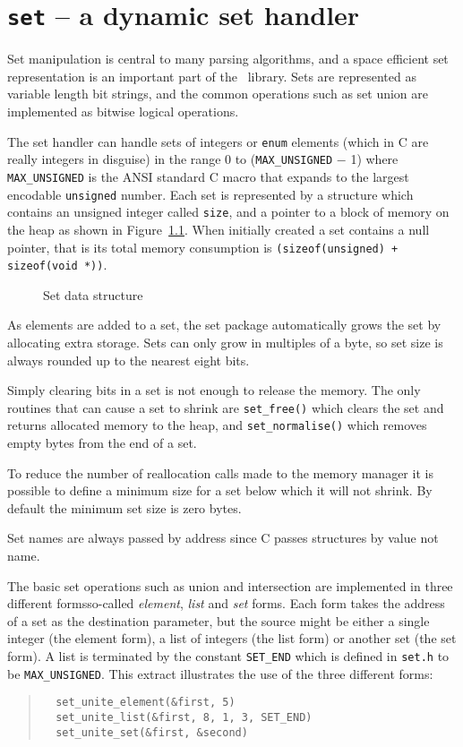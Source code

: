 \chapter{{\tt set} -- a dynamic set handler}

Set manipulation is central to many parsing algorithms, and a space
efficient set representation is an important part of the \rdpsupp\
library. Sets are represented as variable length bit strings, and the
common operations such as set union are implemented as bitwise logical
operations. 

The set handler can handle sets of integers or {\tt enum} elements
(which in C are really integers in disguise) in the range 0 to
(\verb+MAX_UNSIGNED+ $-$ 1) where \verb+MAX_UNSIGNED+ is the ANSI
standard C macro that expands to the largest encodable {\tt unsigned}
number. Each set is represented by a structure which contains an
unsigned integer called  {\tt size}, and a pointer to a block of memory
on the heap as shown in Figure~\ref{set:structure}. When initially
created a set contains a null pointer, that is its total memory
consumption is \verb|(sizeof(unsigned) + sizeof(void *))|.

\begin{figure}
\begin{center}

\end{center}
\caption{Set data structure}
\label{set:structure}
\end{figure}

As elements are added to a set, the set package automatically grows the
set by allocating extra storage. Sets can only grow in multiples of a
 byte,
so set size is always rounded up to the nearest eight bits.

Simply clearing bits in a set is not enough to release the memory.
The only routines that can cause a set to shrink are \verb+set_free()+
which clears the set and returns allocated memory to the heap, and
\verb+set_normalise()+ which removes empty bytes from the end of a set.

To reduce the number of reallocation calls made to the memory manager it
is possible to define a minimum size for a set below which it will not
shrink. By default the minimum set size is zero bytes.

Set names are always passed by address since C passes structures by
value not name. 

The basic set operations such as union and intersection are implemented in three
 different forms\dash so-called {\em element}, {\em list} and {\em set\/}
forms. Each form takes the address of a set as the destination
parameter, but the source might be either a single integer (the element
form), a list of integers (the list form) or another set (the set form).
A list is terminated by the constant \verb+SET_END+ which is defined in
{\tt set.h} to be \verb+MAX_UNSIGNED+. This extract 
illustrates the use of the three different
forms:
\begin{quote}
\begin{verbatim}
  set_unite_element(&first, 5)
  set_unite_list(&first, 8, 1, 3, SET_END)
  set_unite_set(&first, &second)
\end{verbatim}
\end{quote}

